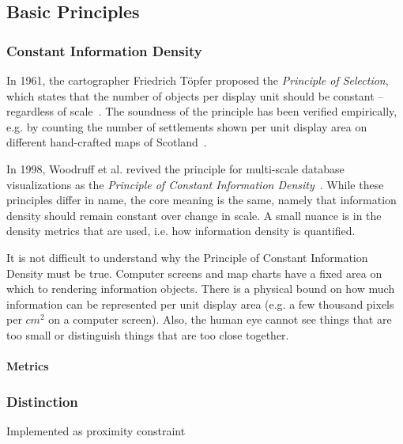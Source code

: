 \documentclass[11pt, oneside]{report}   	%
\begin{document}
\subsection{Basic Principles}

\subsubsection{Constant Information Density}
In 1961, the cartographer Friedrich T\"{o}pfer proposed the \emph{Principle of Selection}, which states that the number of objects per display unit should be constant -- regardless of scale~\cite{topfer1966principles}. The soundness of the principle has been verified empirically, e.g. by counting the number of settlements shown per unit display area on different hand-crafted maps of Scotland~\cite{topfer1966principles}. 

In 1998, Woodruff et al. revived the principle for multi-scale database visualizations as the \emph{Principle of Constant Information Density}~\cite{woodruff1998constant}. While these principles differ in name, the core meaning is the same, namely that information density should remain constant over change in scale. A small nuance is in the density metrics that are used, i.e. how information density is quantified.

It is not difficult to understand why the Principle of Constant Information Density must be true. Computer screens and map charts have a fixed area on which to rendering information objects. There is a physical bound on how much information can be represented per unit display area (e.g. a few thousand pixels per $cm^2$ on a computer screen). Also, the human eye cannot see things that are too small or distinguish things that are too close together.

\paragraph{Metrics}

\subsubsection{Distinction}

Implemented as proximity constraint
\end{document}
